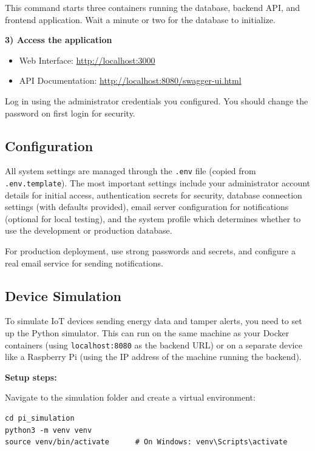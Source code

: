 This command starts three containers running the database, backend API, and frontend application. Wait a minute or two for the database to initialize.

\textbf{3) Access the application}
\begin{itemize}
    \item Web Interface: \url{http://localhost:3000}
    \item API Documentation: \url{http://localhost:8080/swagger-ui.html}
\end{itemize}

Log in using the administrator credentials you configured. You should change the password on first login for security.

\subsection{Configuration}
\label{subsec:system-configuration}

All system settings are managed through the \texttt{.env} file (copied from \texttt{.env.template}). The most important settings include your administrator account details for initial access, authentication secrets for security, database connection settings (with defaults provided), email server configuration for notifications (optional for local testing), and the system profile which determines whether to use the development or production database.

For production deployment, use strong passwords and secrets, and configure a real email service for sending notifications.

\subsection{Device Simulation}
\label{subsec:device-simulation}

To simulate IoT devices sending energy data and tamper alerts, you need to set up the Python simulator. This can run on the same machine as your Docker containers (using \texttt{localhost:8080} as the backend URL) or on a separate device like a Raspberry Pi (using the IP address of the machine running the backend).

\textbf{Setup steps:}

Navigate to the simulation folder and create a virtual environment:
\begin{verbatim}
cd pi_simulation
python3 -m venv venv
source venv/bin/activate      # On Windows: venv\Scripts\activate
\end{verbatim}

